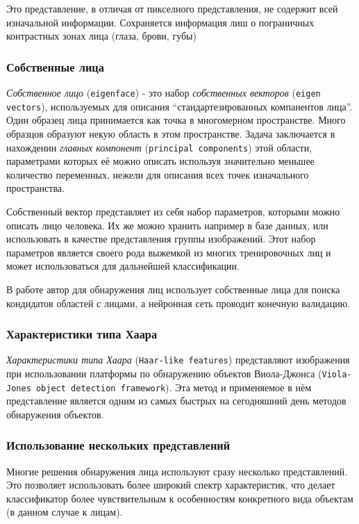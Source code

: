 \documentclass[12pt]{report}
\begin{document}
Это представление, в отличая от пикселного представления, не содержит всей изначальной информации. Сохраняется информация лиш о пограничных контрастных зонах лица (глаза, брови, губы)
\subsubsection{Собственные лица}
\emph{Собственное лицо} (\texttt{eigenface}) - это набор \emph{собственных векторов} (\texttt{eigen vectors}), используемых для описания ``стандартезированных  компанентов лица''. Один образец лица принимается как точка в многомерном пространстве. Много образцов образуют некую область в этом пространстве. Задача заключается в нахождении \emph{главных компонент} (\texttt{principal components}) этой области, параметрами которых её можно описать используя значительно меньшее количество переменных, нежели для описания всех точек изначального пространства.\citep{turk1991eigenfaces}

Собственный вектор представляет из себя набор параметров, которыми можно описать лицо человека. Их же можно хранить например в базе данных, или использовать в качестве представления группы изображений. Этот набор параметров является своего рода выжемкой из многих тренировочных лиц и может использоваться для дальнейшей классификации.

В работе \citep{tsai2006face} автор для обнаружения лиц использует собственные лица для поиска кондидатов областей с лицами, а нейронная сеть проводит конечную валидацию.
\subsubsection{Характеристики типа Хаара}
\emph{Характеристики типа Хаара} (\texttt{Haar-like features})  представляют изображения при использовании платформы по обнаружению объектов Виола-Джонса (\texttt{Viola-Jones object detection framework}). \citep{viola2001rapid}
Эта метод и применяемое в нём представление является одним из самых быстрых на сегодняшний день методов обнаружения объектов.
\subsubsection{Использование нескольких представлений}
Многие решения обнаружения лица используют сразу несколько представлений. Это позволяет использовать более широкий спектр характеристик, что делает классификатор более чувствительным к особенностям конкретного вида объектам (в данном случае к лицам).
\end{document}
